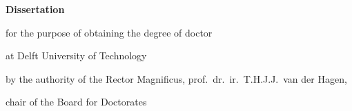 \begin{titlepage}

    \begin{center}

        \vspace*{2\bigskipamount}

        {\makeatletter
            \titlestyle\bfseries\LARGE\@title
            \makeatother}

        {\makeatletter
            \ifx\@subtitle\undefined\else
                \bigskip
                \titlefont\titleshape\Large\@subtitle
            \fi
            \makeatother}

    \end{center}

    \cleardoublepage
    \thispagestyle{empty}

    \begin{center}


        \vspace*{2\bigskipamount}

        {\makeatletter
            \titlestyle\bfseries\LARGE\@title
            \makeatother}

        {\makeatletter
            \ifx\@subtitle\undefined\else
                \bigskip
                \titlefont\titleshape\Large\@subtitle
            \fi
            \makeatother}

        \vfill


        {\Large\titlefont\bfseries Dissertation}

        \bigskip
        \bigskip

        for the purpose of obtaining the degree of doctor

        at Delft University of Technology

        by the authority of the Rector Magnificus, prof.~dr.~ir.~T.H.J.J.~van der Hagen,

        chair of the Board for Doctorates


\end{center}
\end{titlepage}
